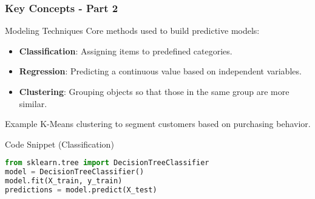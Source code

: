 \documentclass[aspectratio=169]{beamer}
\begin{document}
\begin{frame}[fragile]
    \frametitle{Key Concepts - Part 2}
    \begin{block}{Modeling Techniques}
        Core methods used to build predictive models:
        \begin{itemize}
            \item \textbf{Classification}: Assigning items to predefined categories.
            \item \textbf{Regression}: Predicting a continuous value based on independent variables.
            \item \textbf{Clustering}: Grouping objects so that those in the same group are more similar.
        \end{itemize}
    \end{block}
    
    \begin{block}{Example}
        K-Means clustering to segment customers based on purchasing behavior.
    \end{block}
    
    \begin{block}{Code Snippet (Classification)}
        \begin{lstlisting}[language=Python]
from sklearn.tree import DecisionTreeClassifier
model = DecisionTreeClassifier()
model.fit(X_train, y_train)
predictions = model.predict(X_test)
        \end{lstlisting}
    \end{block}
\end{frame}
\end{document}
